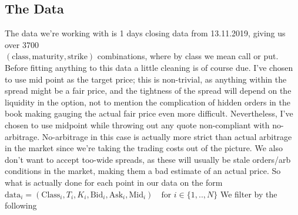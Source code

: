 
\subsection{The Data}
\label{sec:data-cleaning}
The data we're working with is 1 days closing data from 13.11.2019, giving us over 3700 \\$(\text{class}, \text{maturity}, \text{strike})$ combinations,
where by class we mean call or put. Before fitting anything to this data a little cleaning is of course due. I've chosen to use mid point as the
target price; this is non-trivial, as anything within the spread might be a fair price, and the tightness of the spread will depend on the liquidity in the option,
not to mention the complication of hidden orders in the book making gauging the actual fair price even more difficult. Nevertheless, I've chosen to use midpoint
while throwing out any quote non-compliant with no-arbitrage. No-arbitrage in this case is actually more strict than actual arbitrage in the market since we're
taking the trading costs out of the picture. We also don't want to accept too-wide spreads, as these will usually be stale orders/arb conditions in the market,
making them a bad estimate of an actual price. So what is actually done for each point in our data on the form $\text{data}_i=(\text{Class}_i,T_i,K_i,\text{Bid}_i,\text{Ask}_i,\text{Mid}_i)\quad \text{for} \,\, i\in\{1,..,N\}$
We filter by the following

